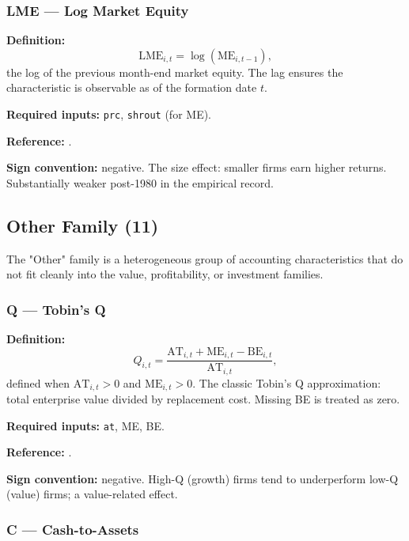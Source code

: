 \subsubsection{LME --- Log Market Equity}

\textbf{Definition:}
\begin{equation}
\mathrm{LME}_{i,t} = \log(\mathrm{ME}_{i,t-1}),
\label{eq:lme}
\end{equation}
the log of the previous month-end market equity. The lag ensures the
characteristic is observable as of the formation date $t$.

\textbf{Required inputs:} \texttt{prc}, \texttt{shrout} (for ME).

\textbf{Reference:} \cite{Banz1981,FamaFrench1992}.

\textbf{Sign convention:} negative. The size effect: smaller firms
earn higher returns. Substantially weaker post-1980 in the empirical
record.

\subsection{Other Family (11)}
\label{subsec:stage0-other}

The "Other" family is a heterogeneous group of accounting
characteristics that do not fit cleanly into the value, profitability,
or investment families.

\subsubsection{Q --- Tobin's Q}

\textbf{Definition:}
\begin{equation}
Q_{i,t} = \frac{\mathrm{AT}_{i,t} + \mathrm{ME}_{i,t} - \mathrm{BE}_{i,t}}
                {\mathrm{AT}_{i,t}},
\label{eq:tobins-q}
\end{equation}
defined when $\mathrm{AT}_{i,t} > 0$ and $\mathrm{ME}_{i,t} > 0$. The
classic Tobin's Q approximation: total enterprise value divided by
replacement cost. Missing BE is treated as zero.

\textbf{Required inputs:} \texttt{at}, ME, BE.

\textbf{Reference:} \cite{Tobin1969,LangStulz1994}.

\textbf{Sign convention:} negative. High-Q (growth) firms tend to
underperform low-Q (value) firms; a value-related effect.

\subsubsection{C --- Cash-to-Assets}

